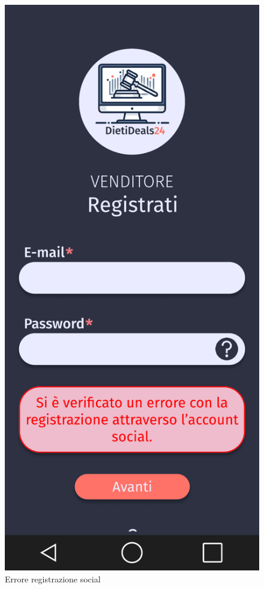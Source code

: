 \begin{figure}[!htb]
\begin{minipage}{0.32\textwidth}
            \includegraphics[width=.7\linewidth]{Immagini/Frames/Errori/E6.pdf}
            \caption{Errore registrazione social}
        \end{minipage}\hfill
    \end{figure}

    \clearpage
    
